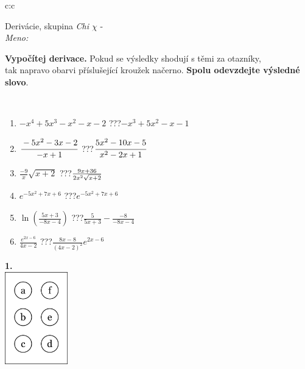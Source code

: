 \documentclass[10pt]{report}
\begin{document}
\begin{tabular}{c:c}
\begin{minipage}[c][104.5mm][t]{0.5\linewidth}
\begin{center}
\vspace{7mm}
{\huge Derivácie, skupina \textit{Chi $\chi$} -}\\[5mm]
\textit{Meno:}\phantom{xxxxxxxxxxxxxxxxxxxxxxxxxxxxxxxxxxxxxxxxxxxxxxxxxxxxxxxxxxxxxxxxx}\\[5mm]
\begin{minipage}{0.95\linewidth}
\begin{center}
\textbf{Vypočítej derivace.} Pokud se výsledky shodují s těmi za otazníky,\\tak napravo obarvi příslušející kroužek načerno. \textbf{Spolu odevzdejte výsledné slovo}.
\end{center}
\end{minipage}
\\[1mm]
\begin{minipage}{0.79\linewidth}
\begin{center}
\begin{varwidth}{\linewidth}
\begin{enumerate}
\normalsize
\item $-x^4+5x^3-x^2-x-2$\quad \dotfill\; ???\;\dotfill \quad $-x^3+5x^2-x-1$
\item $\cfrac{-5x^2-3x-2}{-x+1}$\quad \dotfill\; ???\;\dotfill \quad $\cfrac{5x^2-10x-5}{x^2-2x+1}$
\item $\frac{-9}{x}\sqrt{x+2}$\quad \dotfill\; ???\;\dotfill \quad $\frac{9x+36}{2x^2 \sqrt{\smash[b]{x+2}}}$
\item $e^{-5x^2+7x+6}$\quad \dotfill\; ???\;\dotfill \quad $e^{-5x^2+7x+6}$
\item $\ln{\left(\frac{5x+3}{-8x-4}\right)}$\quad \dotfill\; ???\;\dotfill \quad $\frac{5}{5x+3}-\frac{-8}{-8x-4}$
\item $\frac{e^{2x-6}}{4x-2}$\quad \dotfill\; ???\;\dotfill \quad $\frac{8x-8}{(4x-2)^2}e^{2x-6}$
\end{enumerate}
\end{varwidth}
\end{center}
\end{minipage}
\begin{minipage}{0.20\linewidth}
\begin{center}
{\Huge\bfseries 1.} \\[2mm]
\includegraphics[height=40mm]{../images/braille.png}

\end{center}
\end{minipage}
\end{center}
\end{minipage}
\end{tabular}
\end{document}
